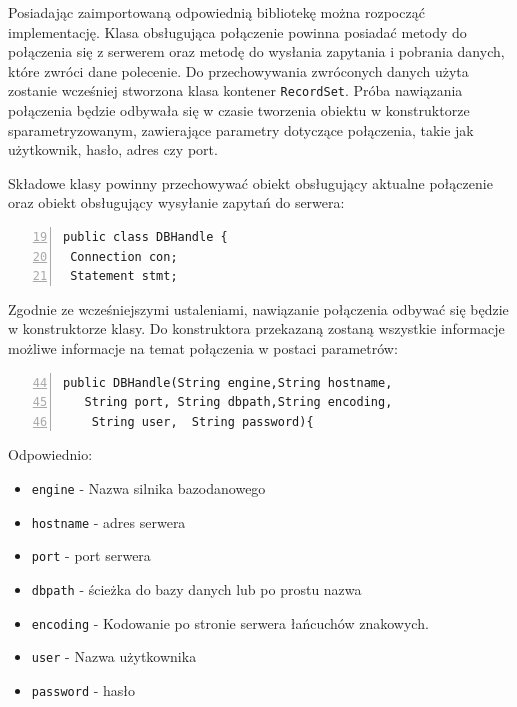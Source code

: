 Posiadając zaimportowaną odpowiednią bibliotekę można rozpocząć implementację. Klasa obsługująca połączenie powinna posiadać metody do połączenia się z serwerem oraz metodę do wysłania zapytania i pobrania danych, które zwróci dane polecenie. Do przechowywania zwróconych danych użyta zostanie wcześniej stworzona klasa kontener \texttt{RecordSet}. Próba nawiązania połączenia będzie odbywała się w czasie tworzenia obiektu w konstruktorze sparametryzowanym, zawierające parametry dotyczące połączenia, takie jak użytkownik, hasło, adres czy port.
\par
Składowe klasy powinny przechowywać obiekt obsługujący aktualne połączenie oraz obiekt obsługujący wysyłanie zapytań do serwera:
 \begin{lstlisting}[numbers=left,firstnumber=19]
public class DBHandle {
 Connection con;
 Statement stmt; 
  \end{lstlisting}
  Zgodnie ze wcześniejszymi ustaleniami, nawiązanie połączenia odbywać się będzie w konstruktorze klasy. Do konstruktora przekazaną zostaną wszystkie informacje możliwe informacje na temat połączenia w postaci parametrów:
   \begin{lstlisting}[numbers=left,firstnumber=44]
   public DBHandle(String engine,String hostname,
   String port, String dbpath,String encoding,
    String user,  String password){
   \end{lstlisting}
Odpowiednio:
    \begin{itemize}
    \item \texttt{engine} - Nazwa silnika bazodanowego
    \item \texttt{hostname} - adres serwera
    \item \texttt{port} - port serwera
    \item \texttt{dbpath} - ścieżka do bazy danych lub po prostu nazwa
    \item \texttt{encoding} - Kodowanie po stronie serwera łańcuchów znakowych.
    \item \texttt{user} - Nazwa użytkownika
    \item \texttt{password} - hasło
    \end{itemize}

